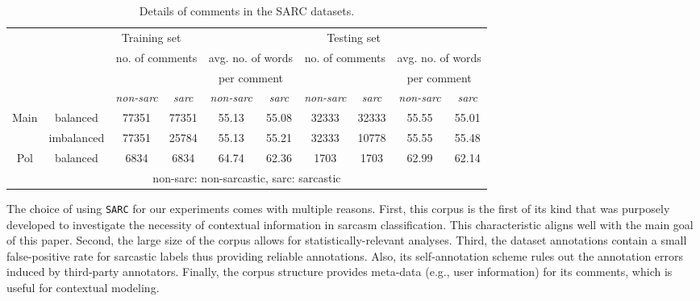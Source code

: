 \documentclass[11pt]{article}
\begin{document}
{\begin{itemize}[leftmargin=*]
\end{itemize}
\begin{table}[h!]
	\small
	\begin{center}
		\begin{tabular}{c|c|c|c|c|c|c|c|c|c}
			\Xhline{3\arrayrulewidth}
			\multicolumn{2}{c|}{}&\multicolumn{4}{c}{Training set}&\multicolumn{4}{|c}{Testing set}\\ \cline{3-10}
            \multicolumn{2}{c|}{}&\multicolumn{2}{c|}{\multirow{2}{*}{no. of comments}}&\multicolumn{2}{c|}{avg. no. of words }&\multicolumn{2}{c|}{\multirow{2}{*}{no. of comments}}&\multicolumn{2}{c}{avg. no. of words}\\ 
            
            \multicolumn{2}{c|}{}&\multicolumn{2}{c|}{}&\multicolumn{2}{c|}{per comment}&\multicolumn{2}{c|}{}&\multicolumn{2}{c}{per comment}\\\cline{3-10}
		   	\multicolumn{2}{c|}{}&\textit{non-sarc}&\textit{sarc}&\textit{non-sarc}&\textit{sarc}&\textit{non-sarc}&\textit{sarc}&\textit{non-sarc}&\textit{sarc}\\ 
            \hline \hline
            \multirow{2}{*}{Main}&balanced&77351&77351&55.13&55.08&32333&32333&55.55&55.01\\
            &imbalanced&77351&25784&55.13&55.21&32333&10778&55.55&55.48\\ \cline{2-2}
            Pol&balanced&6834&6834&64.74&62.36&1703&1703&62.99&62.14\\
            \hline
            \multicolumn{10}{c}{\footnotesize{non-sarc: non-sarcastic, sarc: sarcastic}}
		\end{tabular}
	\end{center}
	\vspace{-0.4cm}
	\caption {Details of comments in the SARC datasets.}
	\label{table:SARCstats}
\end{table} 

The choice of using \verb|SARC| for our experiments comes with multiple reasons. First, this corpus is the first of its kind that was purposely developed to investigate the necessity of contextual information in sarcasm classification. This characteristic aligns well with the main goal of this paper. Second, the large size of the corpus allows for statistically-relevant analyses. Third, the dataset annotations contain a small false-positive rate for sarcastic labels thus providing reliable annotations. Also, its self-annotation scheme rules out the annotation errors induced by third-party annotators. Finally, the corpus structure provides meta-data (e.g., user information) for its comments, which is useful for contextual modeling.

}
\end{document}

